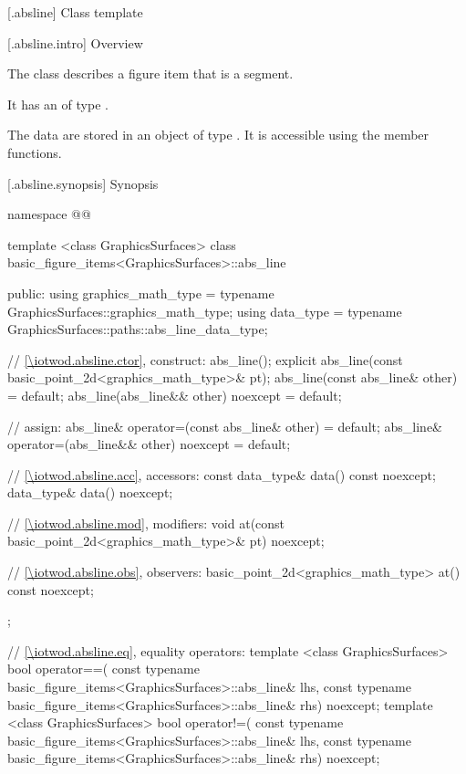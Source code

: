  [\iotwod.absline] {Class template }

 [\iotwod.absline.intro] {Overview}

\pnum
{}%
The class  describes a figure item that is a segment.

\pnum
It has an  of type .

\pnum
The data are stored in an object of type . It is accessible using the  member functions.

 [\iotwod.absline.synopsis] {Synopsis}
\begin{codeblock}
namespace @\fullnamespace{}@ {
  template <class GraphicsSurfaces>
  class basic_figure_items<GraphicsSurfaces>::abs_line {
  public:
    using graphics_math_type = typename GraphicsSurfaces::graphics_math_type;
    using data_type =
      typename GraphicsSurfaces::paths::abs_line_data_type;

    // \ref{\iotwod.absline.ctor}, construct:
    abs_line();
    explicit abs_line(const basic_point_2d<graphics_math_type>& pt);
    abs_line(const abs_line& other) = default;
    abs_line(abs_line&& other) noexcept = default;

    // assign:
    abs_line& operator=(const abs_line& other) = default;
    abs_line& operator=(abs_line&& other) noexcept = default;

    // \ref{\iotwod.absline.acc}, accessors:
    const data_type& data() const noexcept;
    data_type& data() noexcept;

    // \ref{\iotwod.absline.mod}, modifiers:
    void at(const basic_point_2d<graphics_math_type>& pt) noexcept;

    // \ref{\iotwod.absline.obs}, observers:
    basic_point_2d<graphics_math_type> at() const noexcept;
  };
  
  // \ref{\iotwod.absline.eq}, equality operators:
  template <class GraphicsSurfaces>
  bool operator==(
    const typename basic_figure_items<GraphicsSurfaces>::abs_line& lhs,
    const typename basic_figure_items<GraphicsSurfaces>::abs_line& rhs) 
    noexcept;  
  template <class GraphicsSurfaces>
  bool operator!=(
    const typename basic_figure_items<GraphicsSurfaces>::abs_line& lhs,
    const typename basic_figure_items<GraphicsSurfaces>::abs_line& rhs) 
    noexcept;  
}
\end{codeblock}


